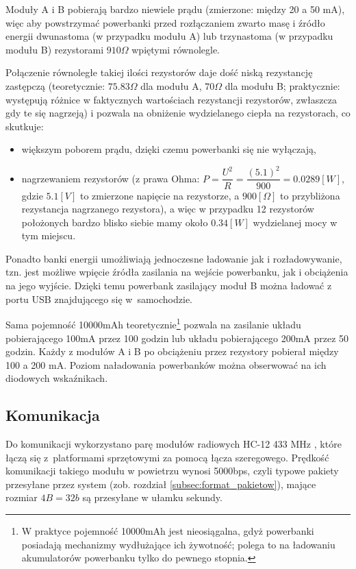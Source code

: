Moduły A i B pobierają bardzo niewiele prądu (zmierzone: między 20 a 50 mA), więc aby powstrzymać powerbanki przed rozłączaniem zwarto masę i źródło energii dwunastoma (w przypadku modułu A) lub trzynastoma (w przypadku modułu B) rezystorami $ 910 \Omega $ wpiętymi równolegle.

Połączenie równoległe takiej ilości rezystorów daje dość niską rezystancję zastępczą (teoretycznie: $ 75.83 \Omega $ dla modułu A, $ 70 \Omega $ dla modułu B; praktycznie: występują różnice w faktycznych wartościach rezystancji rezystorów, zwłaszcza gdy te się nagrzeją) i pozwala na obniżenie wydzielanego ciepła na rezystorach, co skutkuje:

\begin{itemize}
\item większym poborem prądu, dzięki czemu powerbanki się nie wyłączają,
\item nagrzewaniem rezystorów (z prawa Ohma: $ P = \dfrac{U^2}{R} = \dfrac{(5.1)^2}{900} = 0.0289 [W] $, gdzie $ 5.1 [V] $ to zmierzone napięcie na rezystorze, a $ 900 [\Omega] $ to przybliżona rezystancja nagrzanego rezystora), a więc w przypadku 12 rezystorów położonych bardzo blisko siebie mamy około $ 0.34 [W] $ wydzielanej mocy w tym miejscu.
\end{itemize}

Ponadto banki energii umożliwiają jednoczesne ładowanie jak i rozładowywanie, tzn. jest możliwe wpięcie źródła zasilania na wejście powerbanku, jak i obciążenia na jego wyjście. Dzięki temu powerbank zasilający moduł B można ładować z portu USB znajdującego się w~samochodzie.

Sama pojemność 10000mAh teoretycznie\footnote{W praktyce pojemność 10000mAh jest nieosiągalna, gdyż powerbanki posiadają mechanizmy wydłużające ich żywotność; polega to na ładowaniu akumulatorów powerbanku tylko do pewnego stopnia.} pozwala na zasilanie układu pobierającego 100mA przez 100 godzin lub układu pobierającego 200mA przez 50 godzin. Każdy z modułów A i B po obciążeniu przez rezystory pobierał między 100 a 200 mA. Poziom naładowania powerbanków można obserwować na ich diodowych wskaźnikach.

\subsection{Komunikacja}
\label{subsec:komunikacja}

Do komunikacji wykorzystano parę modułów radiowych HC-12 433 MHz \cite{HC12}, które łączą się z~platformami sprzętowymi za pomocą łącza szeregowego. Prędkość komunikacji takiego modułu w powietrzu wynosi 5000bps, czyli typowe pakiety przesyłane przez system (zob. rozdział \ref{subsec:format_pakietow}), mające rozmiar $ 4B=32b $ są przesyłane w ułamku sekundy.

